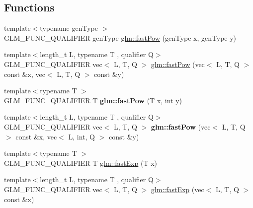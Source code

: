 \subsection*{Functions}
\begin{DoxyCompactItemize}
\item 
{\footnotesize template$<$typename gen\+Type $>$ }\\G\+L\+M\+\_\+\+F\+U\+N\+C\+\_\+\+Q\+U\+A\+L\+I\+F\+I\+ER gen\+Type \hyperlink{group__gtx__fast__exponential_ga5340e98a11fcbbd936ba6e983a154d50}{glm\+::fast\+Pow} (gen\+Type x, gen\+Type y)
\item 
{\footnotesize template$<$length\+\_\+t L, typename T , qualifier Q$>$ }\\G\+L\+M\+\_\+\+F\+U\+N\+C\+\_\+\+Q\+U\+A\+L\+I\+F\+I\+ER vec$<$ L, T, Q $>$ \hyperlink{group__gtx__fast__exponential_ga15325a8ed2d1c4ed2412c4b3b3927aa2}{glm\+::fast\+Pow} (vec$<$ L, T, Q $>$ const \&x, vec$<$ L, T, Q $>$ const \&y)
\item 
\mbox{\label{fast__exponential_8inl_a5a5fcbdc3b4ecfaddf5c66774259bcd3}} 
{\footnotesize template$<$typename T $>$ }\\G\+L\+M\+\_\+\+F\+U\+N\+C\+\_\+\+Q\+U\+A\+L\+I\+F\+I\+ER T {\bfseries glm\+::fast\+Pow} (T x, int y)
\item 
\mbox{\label{fast__exponential_8inl_a2bfd1ff618f99738909aa2a81576df97}} 
{\footnotesize template$<$length\+\_\+t L, typename T , qualifier Q$>$ }\\G\+L\+M\+\_\+\+F\+U\+N\+C\+\_\+\+Q\+U\+A\+L\+I\+F\+I\+ER vec$<$ L, T, Q $>$ {\bfseries glm\+::fast\+Pow} (vec$<$ L, T, Q $>$ const \&x, vec$<$ L, int, Q $>$ const \&y)
\item 
{\footnotesize template$<$typename T $>$ }\\G\+L\+M\+\_\+\+F\+U\+N\+C\+\_\+\+Q\+U\+A\+L\+I\+F\+I\+ER T \hyperlink{group__gtx__fast__exponential_gaa3180ac8f96ab37ab96e0cacaf608e10}{glm\+::fast\+Exp} (T x)
\item 
{\footnotesize template$<$length\+\_\+t L, typename T , qualifier Q$>$ }\\G\+L\+M\+\_\+\+F\+U\+N\+C\+\_\+\+Q\+U\+A\+L\+I\+F\+I\+ER vec$<$ L, T, Q $>$ \hyperlink{group__gtx__fast__exponential_ga3ba6153aec6bd74628f8b00530aa8d58}{glm\+::fast\+Exp} (vec$<$ L, T, Q $>$ const \&x)
\item 
\mbox{\label{fast__exponential_8inl_a68f4f516c08702395c9b76791bab5969}} 

\end{DoxyCompactItemize}
